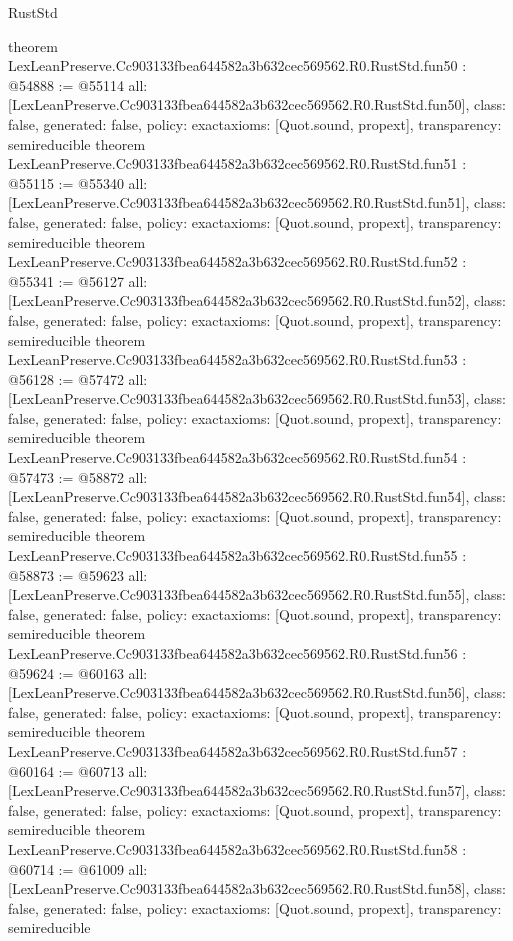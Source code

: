 \begin{lexlean}{RustStd}
\begin{coremodule}
{}
theorem LexLeanPreserve.Cc903133fbea644582a3b632cec569562.R0.RustStd.fun50 : @54888 := @55114 {
  all: [LexLeanPreserve.Cc903133fbea644582a3b632cec569562.R0.RustStd.fun50],
  class: false,
  generated: false,
  policy: exact{axioms: [Quot.sound, propext]},
  transparency: semireducible
}
theorem LexLeanPreserve.Cc903133fbea644582a3b632cec569562.R0.RustStd.fun51 : @55115 := @55340 {
  all: [LexLeanPreserve.Cc903133fbea644582a3b632cec569562.R0.RustStd.fun51],
  class: false,
  generated: false,
  policy: exact{axioms: [Quot.sound, propext]},
  transparency: semireducible
}
theorem LexLeanPreserve.Cc903133fbea644582a3b632cec569562.R0.RustStd.fun52 : @55341 := @56127 {
  all: [LexLeanPreserve.Cc903133fbea644582a3b632cec569562.R0.RustStd.fun52],
  class: false,
  generated: false,
  policy: exact{axioms: [Quot.sound, propext]},
  transparency: semireducible
}
theorem LexLeanPreserve.Cc903133fbea644582a3b632cec569562.R0.RustStd.fun53 : @56128 := @57472 {
  all: [LexLeanPreserve.Cc903133fbea644582a3b632cec569562.R0.RustStd.fun53],
  class: false,
  generated: false,
  policy: exact{axioms: [Quot.sound, propext]},
  transparency: semireducible
}
theorem LexLeanPreserve.Cc903133fbea644582a3b632cec569562.R0.RustStd.fun54 : @57473 := @58872 {
  all: [LexLeanPreserve.Cc903133fbea644582a3b632cec569562.R0.RustStd.fun54],
  class: false,
  generated: false,
  policy: exact{axioms: [Quot.sound, propext]},
  transparency: semireducible
}
theorem LexLeanPreserve.Cc903133fbea644582a3b632cec569562.R0.RustStd.fun55 : @58873 := @59623 {
  all: [LexLeanPreserve.Cc903133fbea644582a3b632cec569562.R0.RustStd.fun55],
  class: false,
  generated: false,
  policy: exact{axioms: [Quot.sound, propext]},
  transparency: semireducible
}
theorem LexLeanPreserve.Cc903133fbea644582a3b632cec569562.R0.RustStd.fun56 : @59624 := @60163 {
  all: [LexLeanPreserve.Cc903133fbea644582a3b632cec569562.R0.RustStd.fun56],
  class: false,
  generated: false,
  policy: exact{axioms: [Quot.sound, propext]},
  transparency: semireducible
}
theorem LexLeanPreserve.Cc903133fbea644582a3b632cec569562.R0.RustStd.fun57 : @60164 := @60713 {
  all: [LexLeanPreserve.Cc903133fbea644582a3b632cec569562.R0.RustStd.fun57],
  class: false,
  generated: false,
  policy: exact{axioms: [Quot.sound, propext]},
  transparency: semireducible
}
theorem LexLeanPreserve.Cc903133fbea644582a3b632cec569562.R0.RustStd.fun58 : @60714 := @61009 {
  all: [LexLeanPreserve.Cc903133fbea644582a3b632cec569562.R0.RustStd.fun58],
  class: false,
  generated: false,
  policy: exact{axioms: [Quot.sound, propext]},
  transparency: semireducible
}
\end{coremodule}
\end{lexlean}
